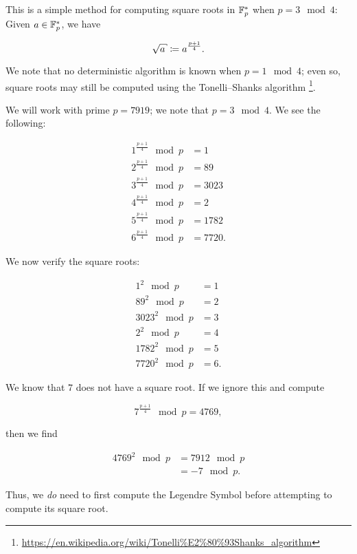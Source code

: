 This is a simple method for computing square roots
in $\mathbb{F}_{p}^{*}$ when $p = 3 \mod 4$:
Given $a\in\mathbb{F}_{p}^{*}$, we have

\begin{equation}
    \sqrt{a} \mathDef{} a^{\frac{p+1}{4}}.
\end{equation}

\noindent
We note that no deterministic algorithm
is known when $p = 1 \mod 4$;
even so, square roots may still be computed using the
Tonelli--Shanks algorithm%
\footnote{\url{https://en.wikipedia.org/wiki/Tonelli\%E2\%80\%93Shanks_algorithm}}.

\begin{example}

We will work with prime $p = 7919$;
we note that $p = 3 \mod 4$.
We see the following:

\begin{align}
    1^{\frac{p+1}{4}} \mod p &= 1
        \nonumber\\
    2^{\frac{p+1}{4}} \mod p &= 89
        \nonumber\\
    3^{\frac{p+1}{4}} \mod p &= 3023
        \nonumber\\
    4^{\frac{p+1}{4}} \mod p &= 2
        \nonumber\\
    5^{\frac{p+1}{4}} \mod p &= 1782
        \nonumber\\
    6^{\frac{p+1}{4}} \mod p &= 7720.
\end{align}

\noindent
We now verify the square roots:

\begin{align}
    1^{2} \mod p &= 1
        \nonumber\\
    89^{2} \mod p &= 2
        \nonumber\\
    3023^{2} \mod p &= 3
        \nonumber\\
    2^{2} \mod p &= 4
        \nonumber\\
    1782^{2} \mod p &= 5
        \nonumber\\
    7720^{2} \mod p &= 6.
\end{align}

We know that $7$ does not have a square root.
If we ignore this and compute

\begin{equation}
    7^{\frac{p+1}{4}} \mod p = 4769,
\end{equation}

\noindent
then we find

\begin{align}
    4769^{2} \mod p &= 7912 \mod p \nonumber\\
        &= -7 \mod p.
\end{align}

\noindent
Thus, we \emph{do} need to first compute the Legendre Symbol
before attempting to compute its square root.
\end{example}
